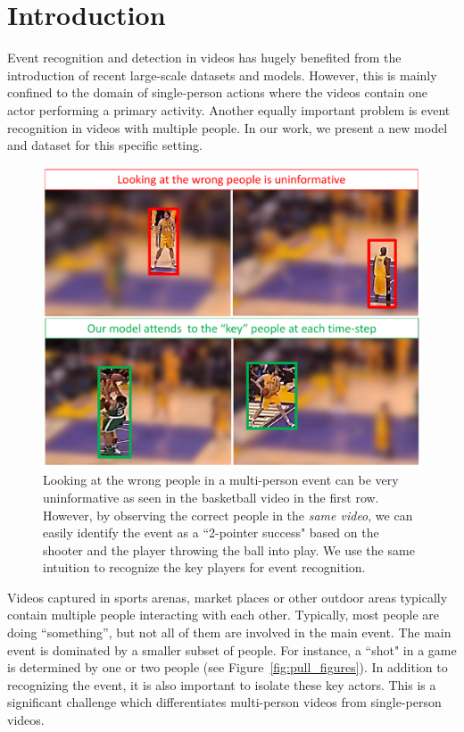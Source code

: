 \section{Introduction}

Event recognition and detection in videos has hugely benefited from the
introduction of recent large-scale datasets
\cite{THUMOS,UCF101,Karpathy_CVPR14,MED11} and models.  However, this is mainly
confined to the domain of single-person actions where the videos contain one
actor performing a primary activity.  Another equally important problem is
event recognition in videos with multiple people. In our work, we present a new
model and dataset for this specific setting.

\begin{figure}[ht!]
\begin{center}
  \includegraphics[width=3.2 in]{images/pull_figure_v3_cropped.pdf}
\end{center}
\caption{Looking at the wrong people in a multi-person event can be very uninformative
  as seen in the basketball video in the first row. However, by observing the correct
  people in the \emph{same video}, we can easily identify the event as a ``2-pointer success" based
  on the shooter and the player throwing the ball into play. We use the same intuition
to recognize the key players for event recognition.}
\label{fig:pull_figure}
\end{figure}

Videos captured in sports arenas, market places or other outdoor areas
typically contain multiple people interacting with each other.
Typically, most people are doing ``something'', but not all of them are involved in the main event.
The main event is dominated by a smaller subset of people. For instance, a ``shot" in a game
is determined by one or two people (see Figure~\ref{fig:pull_figures}).
In addition to recognizing the event, it is also important
to isolate these key actors. This is a significant challenge which
differentiates multi-person videos from single-person videos.

